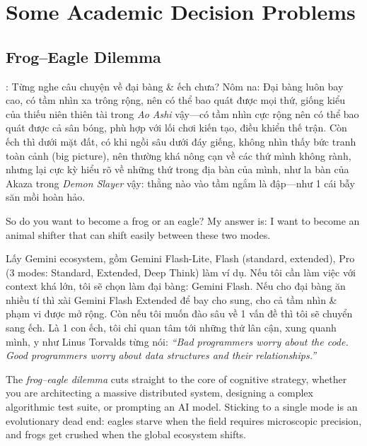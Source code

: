 \documentclass{article}
\begin{document}
\section{Some Academic Decision Problems}

\subsection{Frog--Eagle Dilemma}

{:} Từng nghe câu chuyện về đại bàng \& ếch chưa? Nôm na: Đại bàng luôn bay cao, có tầm nhìn xa trông rộng, nên có thể bao quát được mọi thứ, giống kiểu của thiếu niên thiên tài trong \textit{Ao Ashi} vậy---có tầm nhìn cực rộng nên có thể bao quát được cả sân bóng, phù hợp với lối chơi kiến tạo, điều khiển thế trận. Còn ếch thì dưới mặt đất, có khi ngồi sâu dưới đáy giếng, không nhìn thấy bức tranh toàn cảnh (big picture), nên thường khá nông cạn về các thứ mình không rành, nhưng lại cực kỳ hiểu rõ về những thứ trong địa bàn của mình, như la bàn của Akaza trong \textit{Demon Slayer} vậy: thằng nào vào tầm ngắm là đập---như 1 cái bẫy săn mồi hoàn hảo.

So do you want to become a frog or an eagle? My answer is: I want to become an animal shifter that can shift easily between these two modes.

Lấy Gemini ecosystem, gồm Gemini Flash-Lite, Flash (standard, extended), Pro (3 modes: Standard, Extended, Deep Think) làm ví dụ. Nếu tôi cần làm việc với context khá lớn, tôi sẽ chọn làm đại bàng: Gemini Flash. Nếu cho đại bàng ăn nhiều tí thì xài Gemini Flash Extended để bay cho sung, cho cả tầm nhìn \& phạm vi được mở rộng. Còn nếu tôi muốn đào sâu về 1 vấn đề thì tôi sẽ chuyển sang ếch. Là 1 con ếch, tôi chỉ quan tâm tới những thứ lân cận, xung quanh mình, y như Linus Torvalds từng nói: \textit{``Bad programmers worry about the code. Good programmers worry about data structures and their relationships.''}

\vspace{0.5em}
The \textit{frog--eagle dilemma} cuts straight to the core of cognitive strategy, whether you are architecting a massive distributed system, designing a complex algorithmic test suite, or prompting an AI model. Sticking to a single mode is an evolutionary dead end: eagles starve when the field requires microscopic precision, and frogs get crushed when the global ecosystem shifts.
\end{document}
